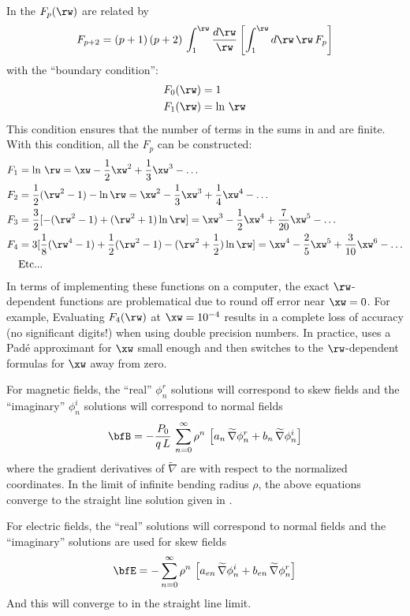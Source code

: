 In  the $F_p(\rw)$ are related by
\begin{equation}
  F_{p+2} = (p + 1) \, (p + 2) \, \int_1^{\rw} \frac{d\rw}{\rw} 
  \left[ \int_1^{\rw} d\rw \, \rw \, F_{p} \right]
\end{equation}
with the ``boundary condition'':
\begin{align}
  F_0(\rw) &= 1 \CRNO
  F_1(\rw) &= \ln \, \rw
\end{align}
This condition ensures that the number of terms in the sums in  and 
are finite. With this condition, all the $F_p$ can be constructed:
\begin{align}
  F_1 &= \ln \, \rw = \xw - \frac{1}{2}\xw^2 + \frac{1}{3}\xw^3 - \ldots \CRNO
  F_2 &= \frac{1}{2} (\rw^2 - 1) - \ln \rw = \xw^2 - \frac{1}{3}\xw^3 + \frac{1}{4} \xw^4 - \ldots \CRNO
  F_3 &= \frac{3}{2} [-(\rw^2 - 1) + (\rw^2 + 1) \ln \rw] = \xw^3 - \frac{1}{2} \xw^4 + \frac{7}{20} \xw^5 - \ldots 
         \label{ffff} \\
  F_4 &= 3 [ \frac{1}{8} (\rw^4 - 1) + \frac{1}{2} (\rw^2 - 1) - (\rw^2 + \frac{1}{2}) \ln \rw] = 
         \xw^4 - \frac{2}{5} \xw^5 + \frac{3}{10} \xw^6 - \ldots \CRNO
  &\text{Etc...} \nonumber
\end{align}
In terms of implementing these functions on a computer, the exact $\rw$-dependent functions are
problematical due to round off error near $\xw = 0$. For example, Evaluating $F_4(\rw)$ at $\xw =
10^{-4}$ results in a complete loss of accuracy (no significant digits!) when using double precision
numbers. In practice, \bmad uses a Pad\'e approximant for $\xw$ small enough and then switches to the
$\rw$-dependent formulas for $\xw$ away from zero.

For magnetic fields, the ``real'' $\phi_n^r$ solutions will correspond to skew fields and the
``imaginary'' $\phi_n^i$ solutions will correspond to normal fields
\begin{equation}
  \bfB = -\frac{P_0}{q \, L} \, 
    \sum_{n = 0}^\infty \rho^n \, \left[ a_n \, \widetilde \nabla \phi_n^r + b_n \, \widetilde \nabla \phi_n^i \right]
  \label{bpql}
\end{equation}
where the gradient derivatives of $\widetilde \nabla$ are with respect to the normalized
coordinates. In the limit of infinite bending radius $\rho$, the above equations converge
to the straight line solution given in .

For electric fields, the ``real'' solutions will correspond to normal fields and the
``imaginary'' solutions are used for skew fields
\begin{equation}
  \bfE = -\sum_{n = 0}^\infty \rho^n \, \left[ a_{en} \, \widetilde \nabla \phi_n^i + 
  b_{en} \, \widetilde \nabla \phi_n^r \right]
  \label{enrn}
\end{equation}
And this will converge to  in the straight line limit.

